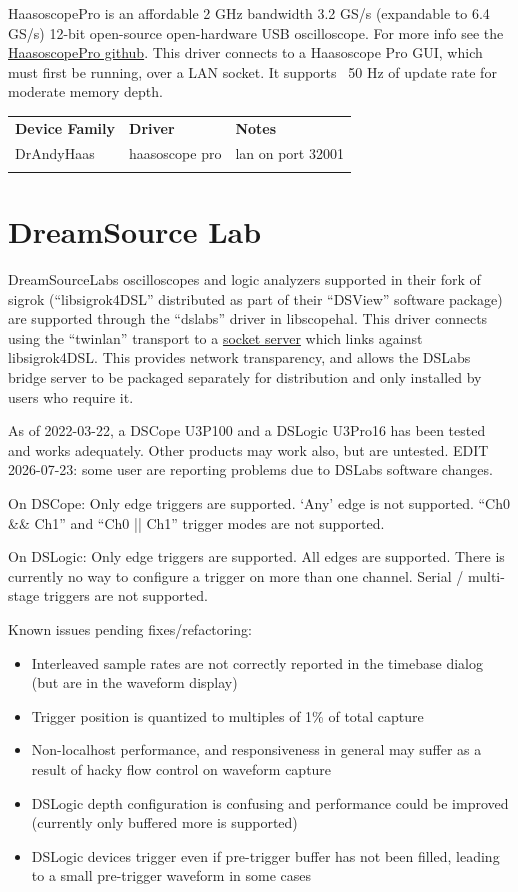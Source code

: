 HaasoscopePro is an affordable 2 GHz bandwidth 3.2 GS/s (expandable to 6.4 GS/s) 12-bit open-source open-hardware USB oscilloscope.
For more info see the \href{https://github.com/drandyhaas/HaasoscopePro}{HaasoscopePro github}.
This driver connects to a Haasoscope Pro GUI, which must first be running, over a LAN socket.
It supports ~50 Hz of update rate for moderate memory depth.

\begin{tabularx}{16cm}{llX}
\thickhline
\textbf{Device Family} & \textbf{Driver} & \textbf{Notes} \\
\thickhline
DrAndyHaas & haasoscope pro & lan on port 32001 \\
\thickhline
\end{tabularx}

\section{DreamSource Lab}

DreamSourceLabs oscilloscopes and logic analyzers supported in their fork of sigrok (``libsigrok4DSL'' distributed as part of
their ``DSView'' software package) are supported through the ``dslabs'' driver in libscopehal. This driver connects using
the ``twinlan'' transport to a \href{https://github.com/ngscopeclient/scopehal-sigrok-bridge}{socket server} which links
against libsigrok4DSL. This provides network transparency, and allows the DSLabs bridge server to be packaged separately for
distribution and only installed by users who require it.

As of 2022-03-22, a DSCope U3P100 and a DSLogic U3Pro16 has been tested and works adequately. Other products may work
also, but are untested. EDIT 2026-07-23: some user are reporting problems due to DSLabs software changes.

On DSCope: Only edge triggers are supported. `Any' edge is not supported. ``Ch0 \&\& Ch1'' and ``Ch0 || Ch1'' trigger modes
are not supported.

On DSLogic: Only edge triggers are supported. All edges are supported. There is currently no way to configure a trigger on more
than one channel. Serial / multi-stage triggers are not supported.

Known issues pending fixes/refactoring:
\begin{itemize}
	\item Interleaved sample rates are not correctly reported in the timebase dialog (but are in the waveform display)
	\item Trigger position is quantized to multiples of 1\% of total capture
	\item Non-localhost performance, and responsiveness in general may suffer as a result of hacky flow control on waveform capture
	\item DSLogic depth configuration is confusing and performance could be improved (currently only buffered more is supported)
	\item DSLogic devices trigger even if pre-trigger buffer has not been filled, leading to a small pre-trigger waveform in some cases
\end{itemize}


